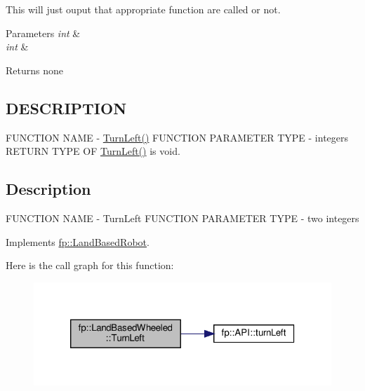 This will just ouput that appropriate function are called or not.


\begin{DoxyParams}{Parameters}
{\em int} & \\
\hline
{\em int} & \\
\hline
\end{DoxyParams}
\begin{DoxyReturn}{Returns}
none 
\end{DoxyReturn}
\hypertarget{_m_a_z_e_8h_DESCRIPTION}{}\subsection{D\+E\+S\+C\+R\+I\+P\+T\+I\+ON}\label{_m_a_z_e_8h_DESCRIPTION}
F\+U\+N\+C\+T\+I\+ON N\+A\+ME -\/ \hyperlink{classfp_1_1_land_based_wheeled_a2f2434db907aaef26b8f3084e84b3579}{Turn\+Left()} F\+U\+N\+C\+T\+I\+ON P\+A\+R\+A\+M\+E\+T\+ER T\+Y\+PE -\/ integers R\+E\+T\+U\+RN T\+Y\+PE OF \hyperlink{classfp_1_1_land_based_wheeled_a2f2434db907aaef26b8f3084e84b3579}{Turn\+Left()} is void.\hypertarget{main_8cpp_Description}{}\subsection{Description}\label{main_8cpp_Description}
F\+U\+N\+C\+T\+I\+ON N\+A\+ME -\/ Turn\+Left F\+U\+N\+C\+T\+I\+ON P\+A\+R\+A\+M\+E\+T\+ER T\+Y\+PE -\/ two integers 

Implements \hyperlink{classfp_1_1_land_based_robot_a359e1012e9093475b7a1b0d38e41a118}{fp\+::\+Land\+Based\+Robot}.

Here is the call graph for this function\+:
\nopagebreak
\begin{figure}[H]
\begin{center}
\leavevmode
\includegraphics[width=320pt]{classfp_1_1_land_based_wheeled_a2f2434db907aaef26b8f3084e84b3579_cgraph}
\end{center}
\end{figure}
\mbox{\label{classfp_1_1_land_based_wheeled_ac6e93b00e624e281a497e99729db04e7}} 
